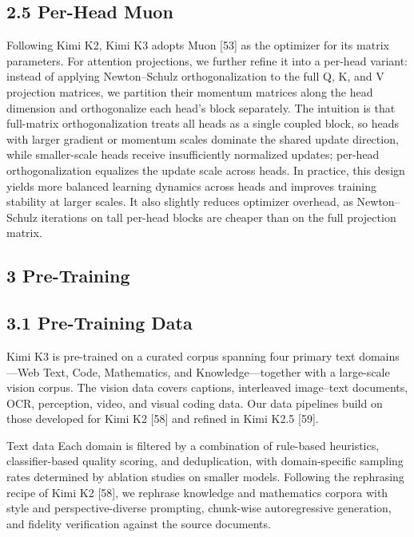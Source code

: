 \documentclass[
  10
]{article}
\begin{document}
\subsection{2.5 Per-Head Muon}\label{per-head-muon}

Following Kimi K2, Kimi K3 adopts Muon {[}53{]} as the optimizer for its
matrix parameters. For attention projections, we further refine it into
a per-head variant: instead of applying Newton--Schulz orthogonalization
to the full Q, K, and V projection matrices, we partition their momentum
matrices along the head dimension and orthogonalize each head's block
separately. The intuition is that full-matrix orthogonalization treats
all heads as a single coupled block, so heads with larger gradient or
momentum scales dominate the shared update direction, while
smaller-scale heads receive insufficiently normalized updates; per-head
orthogonalization equalizes the update scale across heads. In practice,
this design yields more balanced learning dynamics across heads and
improves training stability at larger scales. It also slightly reduces
optimizer overhead, as Newton--Schulz iterations on tall per-head blocks
are cheaper than on the full projection matrix.

\subsection{3 Pre-Training}\label{pre-training}

\subsection{3.1 Pre-Training Data}\label{pre-training-data}

Kimi K3 is pre-trained on a curated corpus spanning four primary text
domains---Web Text, Code, Mathematics, and Knowledge---together with a
large-scale vision corpus. The vision data covers captions, interleaved
image--text documents, OCR, perception, video, and visual coding data.
Our data pipelines build on those developed for Kimi K2 {[}58{]} and
refined in Kimi K2.5 {[}59{]}.

Text data Each domain is filtered by a combination of rule-based
heuristics, classifier-based quality scoring, and deduplication, with
domain-specific sampling rates determined by ablation studies on smaller
models. Following the rephrasing recipe of Kimi K2 {[}58{]}, we rephrase
knowledge and mathematics corpora with style and perspective-diverse
prompting, chunk-wise autoregressive generation, and fidelity
verification against the source documents.
\end{document}
